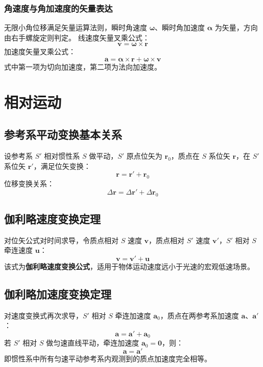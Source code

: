     \subsubsection{角速度与角加速度的矢量表达}
    无限小角位移满足矢量运算法则，瞬时角速度 $\boldsymbol{\omega}$、瞬时角加速度 $\boldsymbol{\alpha}$ 为矢量，方向由右手螺旋定则判定。
    线速度矢量叉乘公式：
    \[
    \boldsymbol{v} = \boldsymbol{\omega} \times \boldsymbol{r}
    \]
    加速度矢量叉乘公式：
    \[
    \boldsymbol{a} = \boldsymbol{\alpha} \times \boldsymbol{r} + \boldsymbol{\omega} \times \boldsymbol{v}
    \]
    式中第一项为切向加速度，第二项为法向加速度。

\section{相对运动}
    \subsection{参考系平动变换基本关系}
    设参考系 $S'$ 相对惯性系 $S$ 做平动，$S'$ 原点位矢为 $\boldsymbol{r}_0$，质点在 $S$ 系位矢 $\boldsymbol{r}$，在 $S'$ 系位矢 $\boldsymbol{r}'$，满足位矢变换：
    \[
    \boldsymbol{r} = \boldsymbol{r}' + \boldsymbol{r}_0
    \]
    位移变换关系：
    \[
    \Delta\boldsymbol{r} = \Delta\boldsymbol{r}' + \Delta\boldsymbol{r}_0
    \]

    \subsection{伽利略速度变换定理}
    对位矢公式对时间求导，令质点相对 $S$ 速度 $\boldsymbol{v}$，质点相对 $S'$ 速度 $\boldsymbol{v}'$，$S'$ 相对 $S$ 牵连速度 $\boldsymbol{u}$：
    \[
    \boldsymbol{v} = \boldsymbol{v}' + \boldsymbol{u}
    \]
    该式为\textbf{伽利略速度变换公式}，适用于物体运动速度远小于光速的宏观低速场景。

    \subsection{伽利略加速度变换定理}
    对速度变换式再次求导，$S'$ 相对 $S$ 牵连加速度 $\boldsymbol{a}_0$，质点在两参考系加速度 $\boldsymbol{a}$、$\boldsymbol{a}'$：
    \[
    \boldsymbol{a} = \boldsymbol{a}' + \boldsymbol{a}_0
    \]
    若 $S'$ 相对 $S$ 做匀速直线平动，牵连加速度 $\boldsymbol{a}_0 = \boldsymbol{0}$，则：
    \[
    \boldsymbol{a} = \boldsymbol{a}'
    \]
    即惯性系中所有匀速平动参考系内观测到的质点加速度完全相等。

